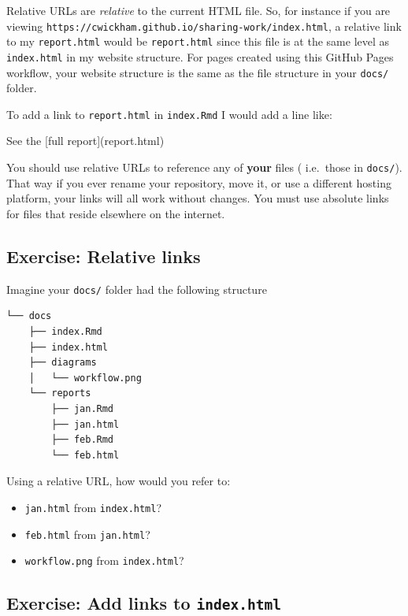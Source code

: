 \documentclass[]{Nemilov}
\newenvironment{Shaded}{\begin{snugshade}}{\end{snugshade}}
\newcommand{\NormalTok}[1]{#1}
\newcommand{\OtherTok}[1]{\textcolor[rgb]{0.56,0.35,0.01}{#1}}
\providecommand{\tightlist}{%
  \setlength{\itemsep}{0pt}\setlength{\parskip}{0pt}}
\begin{document}
Relative URLs are \emph{relative} to the current HTML file.
So,
for instance if you are viewing \texttt{https://cwickham.github.io/sharing-work/index.html},
a relative link to my \texttt{report.html} would be \texttt{report.html} since this file is at the same level as \texttt{index.html} in my website structure.
For pages created using this GitHub Pages workflow,
your website structure is the same as the file structure in your \texttt{docs/} folder.

To add a link to \texttt{report.html} in \texttt{index.Rmd} I would add a line like:

\begin{Shaded}
\begin{Highlighting}[]
\NormalTok{See the }\OtherTok{[full report](report.html)}
\end{Highlighting}
\end{Shaded}

You should use relative URLs to reference any of \textbf{your} files (
i.e.~those in \texttt{docs/}).
That way if you ever rename your repository,
move it,
or use a different hosting platform,
your links will all work without changes.
You must use absolute links for files that reside elsewhere on the internet.

\hypertarget{exercise-relative-links}{%
\subsection{Exercise: Relative links}\label{exercise-relative-links}}

Imagine your \texttt{docs/} folder had the following structure

\begin{verbatim}
└── docs
    ├── index.Rmd
    ├── index.html
    ├── diagrams
    │   └── workflow.png
    └── reports
        ├── jan.Rmd
        ├── jan.html
        ├── feb.Rmd
        └── feb.html
\end{verbatim}

Using a relative URL, how would you refer to:

\begin{itemize}
\tightlist
\item
  \texttt{jan.html} from \texttt{index.html}?
\item
  \texttt{feb.html} from \texttt{jan.html}?
\item
  \texttt{workflow.png} from \texttt{index.html}?
\end{itemize}

\hypertarget{exercise-add-links-to-index.html}{%
\subsection{\texorpdfstring{Exercise: Add links to \texttt{index.html}}{Exercise: Add links to index.html}}\label{exercise-add-links-to-index.html}}
\end{document}
